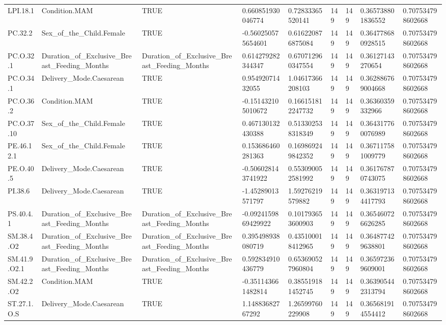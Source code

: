 \begin{longtable}{lllllllll}
LPI.18.1 & Condition.MAM & TRUE & 0.660851930046774 & 0.72833365520141 & 149 & 149 & 0.365738801836552 & 0.707534798602668 \\
PC.32.2 & Sex\_of\_the\_Child.Female & TRUE & -0.560250575654601 & 0.616220876875084 & 149 & 149 & 0.364778680928515 & 0.707534798602668 \\
PC.O.32.1 & Duration\_of\_Exclusive\_Breast\_Feeding\_Months & Duration\_of\_Exclusive\_Breast\_Feeding\_Months & 0.614279282344347 & 0.670712960347554 & 149 & 149 & 0.36127143270654 & 0.707534798602668 \\
PC.O.34.1 & Delivery\_Mode.Caesarean & TRUE & 0.95492071432055 & 1.04617366208103 & 149 & 149 & 0.362886769004668 & 0.707534798602668 \\
PC.O.36.2 & Condition.MAM & TRUE & -0.151432105010672 & 0.166151812247732 & 149 & 149 & 0.36360359332966 & 0.707534798602668 \\
PC.O.37.10 & Sex\_of\_the\_Child.Female & TRUE & 0.467130132430388 & 0.513302538318349 & 149 & 149 & 0.364317760076989 & 0.707534798602668 \\
PE.46.12.1 & Sex\_of\_the\_Child.Female & TRUE & 0.153686460281363 & 0.169869249842352 & 149 & 149 & 0.367117581009779 & 0.707534798602668 \\
PE.O.40.5 & Delivery\_Mode.Caesarean & TRUE & -0.506028143741922 & 0.553090052581992 & 149 & 149 & 0.361767870743075 & 0.707534798602668 \\
PI.38.6 & Delivery\_Mode.Caesarean & TRUE & -1.45289013571797 & 1.59276219579882 & 149 & 149 & 0.363197134417793 & 0.707534798602668 \\
PS.40.4.1 & Duration\_of\_Exclusive\_Breast\_Feeding\_Months & Duration\_of\_Exclusive\_Breast\_Feeding\_Months & -0.0924159869429922 & 0.101793653600903 & 149 & 149 & 0.365460726626285 & 0.707534798602668 \\
SM.38.4.O2 & Duration\_of\_Exclusive\_Breast\_Feeding\_Months & Duration\_of\_Exclusive\_Breast\_Feeding\_Months & 0.395498938080719 & 0.435100018412965 & 149 & 149 & 0.364877429638801 & 0.707534798602668 \\
SM.41.9.O2.1 & Duration\_of\_Exclusive\_Breast\_Feeding\_Months & Duration\_of\_Exclusive\_Breast\_Feeding\_Months & 0.592834910436779 & 0.653690527960804 & 149 & 149 & 0.365972369609001 & 0.707534798602668 \\
SM.42.2.O2 & Condition.MAM & TRUE & -0.351143661482814 & 0.385519181452745 & 149 & 149 & 0.363905442313794 & 0.707534798602668 \\
ST.27.1.O.S & Delivery\_Mode.Caesarean & TRUE & 1.14883682767292 & 1.26599760229908 & 149 & 149 & 0.365681914554412 & 0.707534798602668 \\

\end{longtable}
